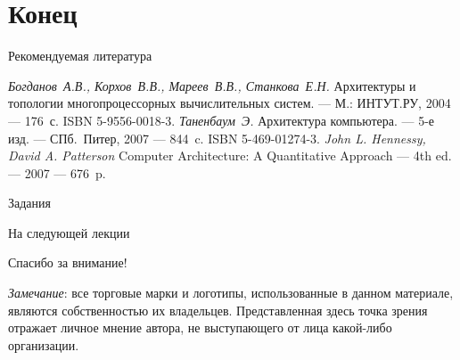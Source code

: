 \section*{Конец}

\begin{frame}[allowframebreaks]{Рекомендуемая литература}
\begin{thebibliography}{99}
    \bibitem{} \textit{Богданов~А.В., Корхов~В.В., Мареев~В.В., Станкова~Е.Н.}
    Архитектуры и топологии многопроцессорных вычислительных систем. --- М.:
    ИНТУТ.РУ, 2004 --- 176~с. ISBN 5-9556-0018-3.
    \bibitem{} \textit{Таненбаум~Э.} Архитектура компьютера. --- 5-е изд. ---
    СПб.~Питер, 2007 --- 844~c. ISBN 5-469-01274-3.
    \bibitem{} \textit{John L. Hennessy, David A. Patterson} Computer
    Architecture: A Quantitative Approach --- 4th ed. --- 2007 --- 676~p.
\end{thebibliography}
\end{frame}

\begin{frame}{Задания}
\end{frame}

\begin{frame}{На следующей лекции}
\end{frame}

\begin{frame}

{\huge{Спасибо за внимание!}\par}

\vfill

\tiny{\textit{Замечание}: все торговые марки и логотипы, использованные в данном материале, являются собственностью их владельцев. Представленная здесь точка зрения отражает личное мнение автора, не выступающего от лица какой-либо организации.}

\end{frame}


